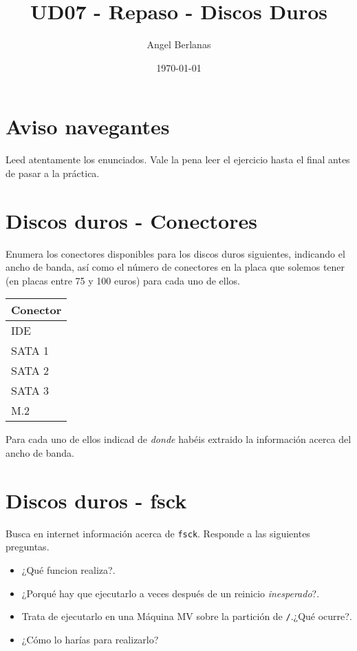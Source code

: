 \documentclass[11pt]{article}
\author{Angel Berlanas}
\date{\today}
\title{UD07 - Repaso - Discos Duros}
\begin{document}
\maketitle
\tableofcontents


\section{Aviso navegantes}
\label{sec:orgbfaf1c9}

Leed atentamente los enunciados. Vale la pena leer el ejercicio hasta el final
antes de pasar a la práctica.

\section{Discos duros - Conectores}
\label{sec:org0386847}

Enumera los conectores disponibles para los discos duros siguientes, indicando
el ancho de banda, así como el número de conectores en la placa que solemos
tener (en placas entre 75 y 100 euros) para cada uno de ellos.

\begin{center}
\begin{tabular}{l}
Conector\\
\hline
IDE\\
SATA 1\\
SATA 2\\
SATA 3\\
M.2\\
\end{tabular}
\end{center}

Para cada uno de ellos indicad de \emph{donde} habéis extraido la información
acerca del ancho de banda.

\section{Discos duros - fsck}
\label{sec:org812e990}

Busca en internet información acerca de \texttt{fsck}. Responde a las siguientes
preguntas.

\begin{itemize}
\item ¿Qué funcion realiza?.
\item ¿Porqué hay que ejecutarlo a veces después de un reinicio \emph{inesperado}?.
\item Trata de ejecutarlo en una Máquina MV sobre la partición de \texttt{/}.¿Qué ocurre?.
\item ¿Cómo lo harías para realizarlo?
\end{itemize}
\end{document}
